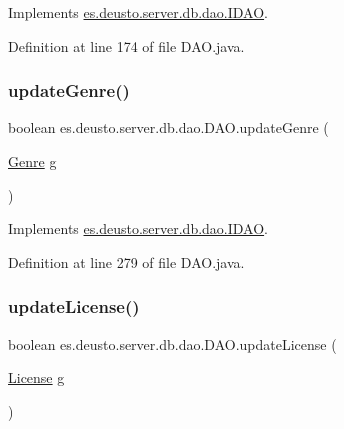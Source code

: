Implements \hyperlink{interfacees_1_1deusto_1_1server_1_1db_1_1dao_1_1_i_d_a_o_a3a3ca0456879e35349a937aac661ff3f}{es.\+deusto.\+server.\+db.\+dao.\+I\+D\+AO}.



Definition at line 174 of file D\+A\+O.\+java.

\mbox{\label{classes_1_1deusto_1_1server_1_1db_1_1dao_1_1_d_a_o_ae08384fb32fa6936c93f6292dbe02c7e}} 
\subsubsection{\texorpdfstring{update\+Genre()}{updateGenre()}}
{\footnotesize\ttfamily boolean es.\+deusto.\+server.\+db.\+dao.\+D\+A\+O.\+update\+Genre (\begin{DoxyParamCaption}\item[{\hyperlink{classes_1_1deusto_1_1server_1_1db_1_1data_1_1_genre}{Genre}}]{g }\end{DoxyParamCaption})}



Implements \hyperlink{interfacees_1_1deusto_1_1server_1_1db_1_1dao_1_1_i_d_a_o_ae989ff2681d6afe8651a595340265c39}{es.\+deusto.\+server.\+db.\+dao.\+I\+D\+AO}.



Definition at line 279 of file D\+A\+O.\+java.

\mbox{\label{classes_1_1deusto_1_1server_1_1db_1_1dao_1_1_d_a_o_a98774e8d93cdd4d8d104a197bd37d4e1}} 
\subsubsection{\texorpdfstring{update\+License()}{updateLicense()}}
{\footnotesize\ttfamily boolean es.\+deusto.\+server.\+db.\+dao.\+D\+A\+O.\+update\+License (\begin{DoxyParamCaption}\item[{\hyperlink{classes_1_1deusto_1_1server_1_1db_1_1data_1_1_license}{License}}]{g }\end{DoxyParamCaption})}



